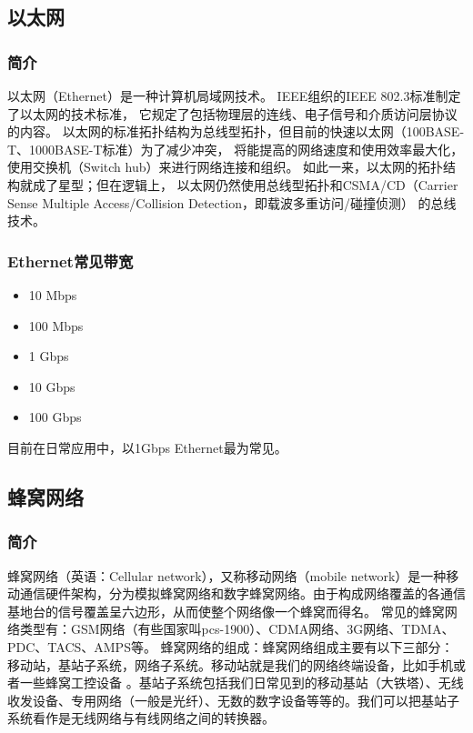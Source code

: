 \documentclass[11pt]{article}
\begin{document}
\subsection{以太网}
\subsubsection{简介}
以太网（Ethernet）是一种计算机局域网技术。
IEEE组织的IEEE 802.3标准制定了以太网的技术标准，
它规定了包括物理层的连线、电子信号和介质访问层协议的内容。
以太网的标准拓扑结构为总线型拓扑，但目前的快速以太网（100BASE-T、1000BASE-T标准）为了减少冲突，
将能提高的网络速度和使用效率最大化，使用交换机（Switch hub）来进行网络连接和组织。
如此一来，以太网的拓扑结构就成了星型；但在逻辑上，
以太网仍然使用总线型拓扑和CSMA/CD（Carrier Sense Multiple Access/Collision Detection，即载波多重访问/碰撞侦测）
的总线技术。
\subsubsection{Ethernet常见带宽}
\begin{itemize}
    \item{10 Mbps}
    \item{100 Mbps}
    \item{1 Gbps}
    \item{10 Gbps}
    \item{100 Gbps}
\end{itemize}
目前在日常应用中，以1Gbps Ethernet最为常见。
\subsection{蜂窝网络}
\subsubsection{简介}
蜂窝网络（英语：Cellular network），又称移动网络（mobile network）是一种移动通信硬件架构，分为模拟蜂窝网络和数字蜂窝网络。由于构成网络覆盖的各通信基地台的信号覆盖呈六边形，从而使整个网络像一个蜂窝而得名。
常见的蜂窝网络类型有：GSM网络（有些国家叫pcs-1900）、CDMA网络、3G网络、TDMA、PDC、TACS、AMPS等。
蜂窝网络的组成：蜂窝网络组成主要有以下三部分：移动站，基站子系统，网络子系统。移动站就是我们的网络终端设备，比如手机或者一些蜂窝工控设备 。基站子系统包括我们日常见到的移动基站（大铁塔）、无线收发设备、专用网络（一般是光纤）、无数的数字设备等等的。我们可以把基站子系统看作是无线网络与有线网络之间的转换器。
\end{document}
